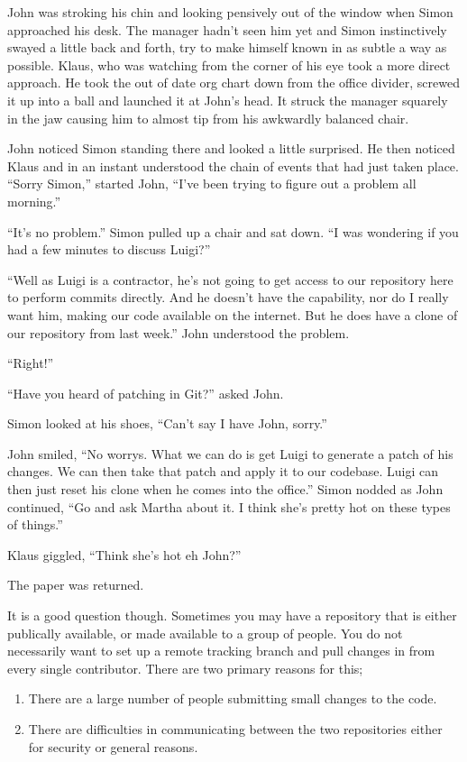 \begin{trenches}
John was stroking his chin and looking pensively out of the window when Simon approached his desk.
The manager hadn't seen him yet and Simon instinctively swayed a little back and forth, try to make himself known in as subtle a way as possible.
Klaus, who was watching from the corner of his eye took a more direct approach.
He took the out of date org chart down from the office divider, screwed it up into a ball and launched it at John's head.
It struck the manager squarely in the jaw causing him to almost tip from his awkwardly balanced chair.

John noticed Simon standing there and looked a little surprised.
He then noticed Klaus and in an instant understood the chain of events that had just taken place.
``Sorry Simon,'' started John, ``I've been trying to figure out a problem all morning.''

``It's no problem.''  Simon pulled up a chair and sat down. ``I was wondering if you had a few minutes to discuss Luigi?''

\thoughtbreak

``Well as Luigi is a contractor, he's not going to get access to our repository here to perform commits directly.
And he doesn't have the capability, nor do I really want him, making our code available on the internet.
But he does have a clone of our repository from last week.'' John understood the problem.

``Right!''

``Have you heard of patching in Git?'' asked John.

Simon looked at his shoes, ``Can't say I have John, sorry.''  

John smiled, ``No worrys. What we can do is get Luigi to generate a patch of his changes.
We can then take that patch and apply it to our codebase.  Luigi can then just reset his clone when he comes into the office.''
Simon nodded as John continued, ``Go and ask Martha about it.  I think she's pretty hot on these types of things.''

Klaus giggled, ``Think she's hot eh John?''

The paper was returned.

\end{trenches}

It is a good question though. Sometimes you may have a repository that is either publically available, or made available to a group of people.
You do not necessarily want to set up a remote tracking branch and pull changes in from every single contributor.
There are two primary reasons for this;
\begin{enumerate}
\item There are a large number of people submitting small changes to the code.
\item There are difficulties in communicating between the two repositories either for security or general reasons.
\end{enumerate}

